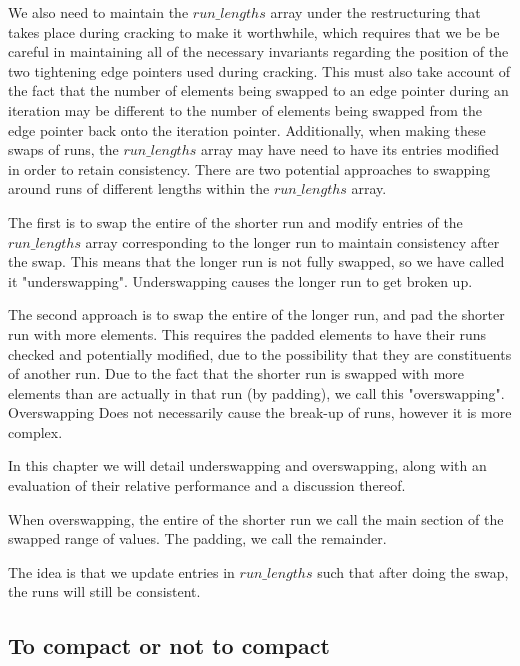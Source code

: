 We also need to maintain the $run\_lengths$ array under the restructuring that takes place during
cracking to make it worthwhile, which requires that we be be careful in maintaining all of the
necessary invariants regarding the position of the two tightening edge pointers used during cracking.
This must also take account of the fact that the number of elements being swapped to an edge
pointer during an iteration may be different to the number of elements being swapped from the edge
pointer back onto the iteration pointer. Additionally, when making these swaps of runs, the
$run\_lengths$ array may have need to have its entries modified in order to retain consistency. There
are two potential approaches to swapping around runs of different lengths within the
$run\_lengths$ array.

The first is to swap the entire of the shorter run and modify entries of the $run\_lengths$ array
corresponding to the longer run to maintain consistency after the swap. This means that the longer
run is not fully swapped, so we have called it "underswapping". Underswapping causes the longer run
to get broken up.

The second approach is to swap the entire of the longer run, and pad the shorter run with more
elements. This requires the padded elements to have their runs checked and potentially modified, due
to the possibility that they are constituents of another run. Due to the fact that the shorter run is
swapped with more elements than are actually in that run (by padding), we call this "overswapping".
Overswapping Does not necessarily cause the break-up of runs, however it is more complex.

In this chapter we will detail underswapping and overswapping, along with an evaluation of their
relative performance and a discussion thereof.



When overswapping, the entire of the shorter run we call the main section of the swapped range of
values. The padding, we call the remainder.

The idea is that we update entries in $run\_lengths$ such that after doing the swap, the runs will
still be consistent.

\subsection{To compact or not to compact}

